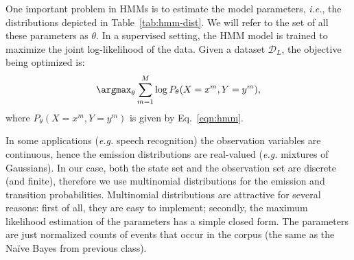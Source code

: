 

One important problem in HMMs is to estimate the 
model parameters, \emph{i.e.}, 
the distributions depicted in Table~\ref{tab:hmm-dist}. 
We will refer to the set of all these parameters 
as $\theta$. 
In a supervised setting, the HMM model
is trained to maximize the joint log-likelihood of the data. Given a
dataset $\mathcal{D}_L$, the objective being optimized is:
\begin{equation}
\argmax_{\theta} \sum_{m=1}^M \log P_{\theta}(X=x^m,Y=y^m),
\end{equation}
where $P_{\theta}(X=x^m,Y=y^m)$ is given by Eq.~\ref{eqn:hmm}.

In some applications (\emph{e.g.} speech recognition) 
the observation variables are continuous, hence the emission distributions are real-valued (\emph{e.g.} mixtures of Gaussians).
In our case, both the state set and the observation set are discrete (and finite), therefore we use
multinomial distributions for the emission and 
transition probabilities. 
Multinomial distributions are attractive for several reasons: first of
all, they are easy to implement; secondly, the maximum likelihood estimation of the parameters has a simple closed form. The parameters are just
normalized counts of events that occur in the corpus (the same as the
Na\"{i}ve Bayes from previous class).

